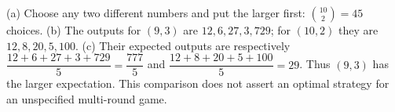 (a) Choose any two different numbers and put the larger first: $\binom{10}{2}=\boxed{45}$ choices. (b) The outputs for $(9,3)$ are $12,6,27,3,729$; for $(10,2)$ they are $12,8,20,5,100$. (c) Their expected outputs are respectively $\dfrac{12+6+27+3+729}{5}=\dfrac{777}{5}$ and $\dfrac{12+8+20+5+100}{5}=29$. Thus $(9,3)$ has the larger expectation. This comparison does not assert an optimal strategy for an unspecified multi-round game.
